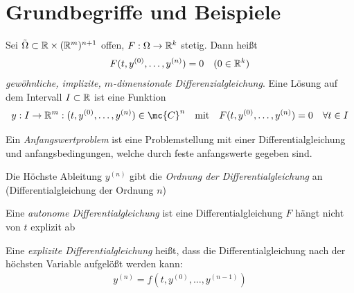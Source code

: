 \documentclass[ngerman]{report}
\begin{document}
\section{Grundbegriffe und Beispiele}
\begin{definition}[Differentialgleichung]
    Sei $\tilde{\Omega}\subset \mathbb{R}\times (\mathbb{R}^m)^{n+1}$ offen, $F:\Omega \to\mathbb{R}^k$ stetig. Dann heißt
    \begin{align*}
        F(t,y^{(0)},\ldots,y^{(n)}) = 0\quad (0\in \mathbb{R}^k)
    \end{align*} 
    \emph{gewöhnliche, implizite, $m$-dimensionale Differenzialgleichung}. Eine Lösung auf dem Intervall $I\subset \mathbb{R}$ ist eine Funktion
    \begin{align*}
        y: I\to\R^m:(t,y^{(0)},\ldots,y^{(n)}) \in \mc{C}^n\quad\text{mit}\quad F(t,y^{(0)},\ldots,y^{(n)}) = 0 \quad \forall t\in I
    \end{align*}
\end{definition}
\begin{definition}[Anfangswertproblem]
    Ein \emph{Anfangswertproblem} ist eine Problemstellung mit einer Differentialgleichung und anfangsbedingungen, welche durch feste anfangswerte gegeben sind.
\end{definition}
\begin{definition}
    Die Höchste Ableitung $y^{(n)}$ gibt die \emph{Ordnung der Differentialgleichung} an (Differentialgleichung der Ordnung $n$)
\end{definition}
\begin{definition}
    Eine \emph{autonome Differentialgleichung} ist eine Differentialgleichung $F$ hängt nicht von $t$ explizit ab
\end{definition}
\begin{definition}
    Eine \emph{explizite Differentialgleichung} heißt, dass die Differentialgleichung nach der höchsten Variable aufgelößt werden kann:
    \begin{align*}
        y^{(n)} = f(t,y^{(0)},\ldots,y^{(n-1)})
    \end{align*}
\end{definition}
\printindex
\end{document}
